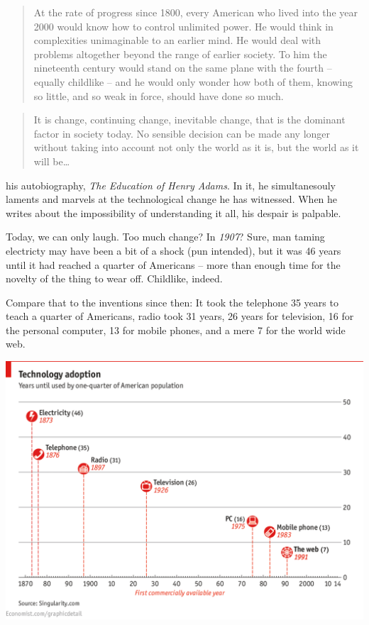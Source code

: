 \begin{quote}
At the rate of progress since 1800, every American who lived into the year 2000
would know how to control unlimited power. He would think in complexities
unimaginable to an earlier mind. He would deal with problems altogether beyond
the range of earlier society. To him the nineteenth century would stand on the
same plane with the fourth -- equally childlike -- and he would only wonder how
both of them, knowing so little, and so weak in force, should have done so much.
\end{quote}

\begin{quote}
It is change, continuing change, inevitable change, that is the dominant factor
in society today. No sensible decision can be made any longer without taking
into account not only the world as it is, but the world as it will be\ldots
{}
\end{quote} 

 his autobiography, \textit{The Education of Henry
Adams}. In it, he simultanesouly laments and marvels at the technological change
he has witnessed. When he writes about the impossibility of
understanding it all, his despair is palpable. 

Today, we can only laugh. Too much change? In \textit{1907}? Sure, man taming electricty may have
been a bit of a shock (pun intended), but it was 46 years until it had reached a
quarter of Americans -- more than enough time for the novelty of the thing to
wear off. Childlike, indeed.

Compare that to the inventions since then: It took the telephone 35 years to teach a quarter of Americans, radio
took 31 years, 26 years for television, 16 for the personal computer, 13 for
mobile phones, and a mere 7 for the world wide web.\bigskip

\includegraphics[width=\textwidth]{graphics/accelerating-change}
\bigskip

